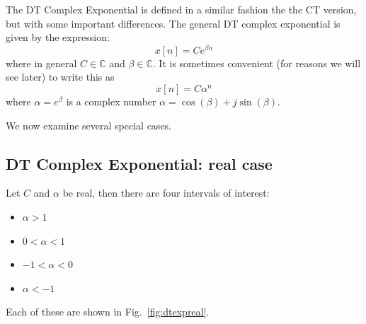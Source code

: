 The DT Complex Exponential is defined in a similar fashion the the CT version, but with some important differences. The general DT complex exponential is given by the expression:
\[
x[n] = Ce^{\beta n}
\]
where in general $C \in \mathbb{C}$ and $\beta \in \mathbb{C}$. It is sometimes convenient (for reasons we will see later) to write this as
\[
x[n] = C \alpha^n
\]
where $\alpha = e^{\beta}$ is a complex number $\alpha = \cos(\beta) + j\sin(\beta)$.

We now examine several special cases.

\subsection{DT Complex Exponential: real case}

Let $C$ and $\alpha$ be real, then there are four intervals of interest:

\begin{itemize}
\item $\alpha > 1$
\item $ 0 < \alpha < 1$
\item $-1 < \alpha < 0$
\item $\alpha < -1$
\end{itemize}

Each of these are shown in Fig.~\ref{fig:dtexpreal}.

